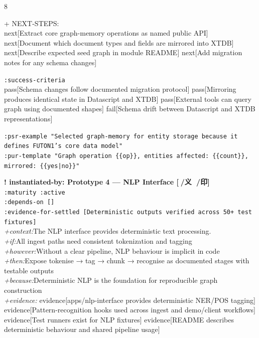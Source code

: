 \documentclass[landscape]{article}
\newcommand{\flexitag}[1]{\textcolor[gray]{0.35}{\textit{#1}}}
\newenvironment{devmapactive}{%
  \def\FrameCommand{\colorbox{devmapactivebg}}%
  \setlength{\fboxsep}{2pt}%
  \MakeFramed{\advance\hsize-\width \FrameRestore}%
}{\endMakeFramed}
\begin{document}
\begin{paracol}{8}
\begin{devmapactive}
  + NEXT-STEPS:\\
    next[Extract core graph-memory operations as named public API] next[Document which document types and fields are mirrored into XTDB] next[Describe expected seed graph in module README] next[Add migration notes for any schema changes]\\
\par
  \texttt{:\allowbreak{}success-\allowbreak{}criteria}\\
    pass[Schema changes follow documented migration protocol] pass[Mirroring produces identical state in Datascript and XTDB] pass[External tools can query graph using documented shapes] fail[Schema drift between Datascript and XTDB representations]\\
\par
  \texttt{:\allowbreak{}psr-\allowbreak{}example "Selected graph-\allowbreak{}memory for entity storage because it defines FUTON1's core data model"}\\
  \texttt{:\allowbreak{}pur-\allowbreak{}template "Graph operation \{\{op\}\},\allowbreak{} entities affected:\allowbreak{} \{\{count\}\},\allowbreak{} mirrored:\allowbreak{} \{\{yes|\allowbreak{}no\}\}"}\\
\par
\par
\end{devmapactive}
\begin{devmapactive}
\textbf{! instantiated-by: Prototype 4 — NLP Interface [📁/义 🎴/印]}\\
  \texttt{:\allowbreak{}maturity :\allowbreak{}active}\\
  \texttt{:\allowbreak{}depends-\allowbreak{}on []}\\
  \texttt{:\allowbreak{}evidence-\allowbreak{}for-\allowbreak{}settled [Deterministic outputs verified across 50+\allowbreak{} test fixtures]}\\
  \flexitag{+context:}The NLP interface provides deterministic text processing.\\
  \flexitag{+if:}All ingest paths need consistent tokenization and tagging\\
  \flexitag{+however:}Without a clear pipeline, NLP behaviour is implicit in code\\
  \flexitag{+then:}Expose tokenise → tag → chunk → recognise as documented stages with testable outputs\\
  \flexitag{+because:}Deterministic NLP is the foundation for reproducible graph construction\\
  \flexitag{+evidence:} evidence[apps/nlp-interface provides deterministic NER/POS tagging] evidence[Pattern-recognition hooks used across ingest and demo/client workflows] evidence[Test runners exist for NLP fixtures] evidence[README describes deterministic behaviour and shared pipeline usage]\\

\end{devmapactive}
\end{paracol}
\end{document}
